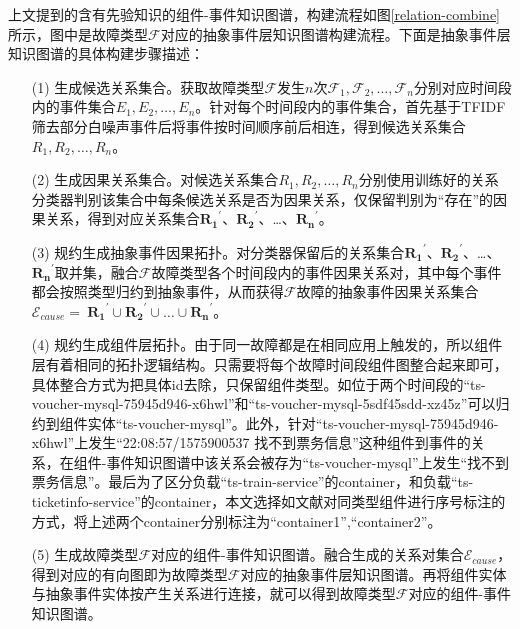 上文提到的含有先验知识的组件-事件知识图谱，构建流程如图\ref{relation-combine}所示，图中是故障类型$\mathcal{F}$对应的抽象事件层知识图谱构建流程。下面是抽象事件层知识图谱的具体构建步骤描述：
\begin{itemize}
    \item [(1)] 
    生成候选关系集合。获取故障类型$\mathcal{F}$发生$n$次$\mathcal{F}_1,\mathcal{F}_2,…,\mathcal{F}_n$分别对应时间段内的事件集合$E_1,E_2,…,E_n$。针对每个时间段内的事件集合，首先基于TFIDF\cite{joachims1996probabilistic}筛去部分白噪声事件后将事件按时间顺序前后相连，得到候选关系集合$R_1,R_2,…,R_n$。  
    \item [(2)]
    生成因果关系集合。对候选关系集合$R_1,R_2,…,R_n$分别使用训练好的关系分类器判别该集合中每条候选关系是否为因果关系，仅保留判别为“存在”的因果关系，得到对应关系集合${\mathbf{R}_\mathbf{1}}^\prime$、${\mathbf{R}_\mathbf{2}}^\prime$、…、${\mathbf{R}_\mathbf{n}}^\prime$。
    \item [(3)]
    规约生成抽象事件因果拓扑。对分类器保留后的关系集合${\mathbf{R}_\mathbf{1}}^\prime$、${\mathbf{R}_\mathbf{2}}^\prime$、…、${\mathbf{R}_\mathbf{n}}^\prime$取并集，融合$\mathcal{F}$故障类型各个时间段内的事件因果关系对，其中每个事件都会按照类型归约到抽象事件，从而获得$\mathcal{F}$故障的抽象事件因果关系集合$\mathcal{E}_{cause}=\ {\mathbf{R}_\mathbf{1}}^\prime\cup{\mathbf{R}_\mathbf{2}}^\prime\cup\ldots\cup{\mathbf{R}_\mathbf{n}}^\prime$。
    \item [(4)]
    规约生成组件层拓扑。由于同一故障都是在相同应用上触发的，所以组件层有着相同的拓扑逻辑结构。只需要将每个故障时间段组件图整合起来即可，具体整合方式为把具体id去除，只保留组件类型。如位于两个时间段的“ts-voucher-mysql-75945d946-x6hwl”和“ts-voucher-mysql-5sdf45sdd-xz45z”可以归约到组件实体“ts-voucher-mysql”。此外，针对“ts-voucher-mysql-75945d946-x6hwl”上发生“22:08:57/1575900537 找不到票务信息”这种组件到事件的关系，在组件-事件知识图谱中该关系会被存为“ts-voucher-mysql”上发生“找不到票务信息”。最后为了区分负载“ts-train-service”的container，和负载“ts-ticketinfo-service”的container，本文选择如文献\cite{qiu2020causality-mining-knowledge-graph}对同类型组件进行序号标注的方式，将上述两个container分别标注为“container1”,“container2”。
    \item [(5)]
    生成故障类型$\mathcal{F}$对应的组件-事件知识图谱。融合生成的关系对集合$\mathcal{E}_{cause}$，得到对应的有向图即为故障类型$\mathcal{F}$对应的抽象事件层知识图谱。再将组件实体与抽象事件实体按产生关系进行连接，就可以得到故障类型$\mathcal{F}$对应的组件-事件知识图谱。
  \end{itemize}

